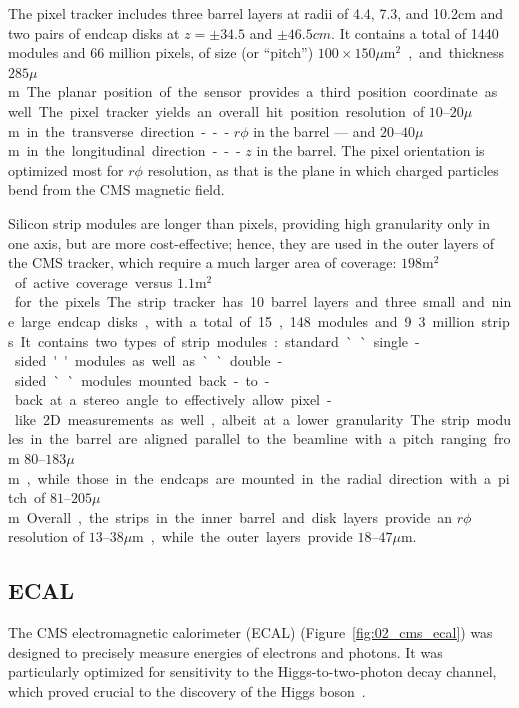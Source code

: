 The pixel tracker includes three barrel layers at radii of 4.4, 7.3, and 10.2\unit{cm} and two pairs of endcap disks at $z = \pm34.5$ and $\pm46.5\unit{cm}$. 
It contains a total of 1440 modules and 66 million pixels, of size (or ``pitch'') $100\times150$\unit{$\mu$m$^2$}, and thickness $285$\unit{$\mu$m}.
The planar position of the sensor provides a third position coordinate as well.
The pixel tracker yields an overall hit position resolution of $10$--$20$\unit{$\mu$m} in the transverse direction --- $r\phi$ in the barrel ---  and $20$--$40$\unit{$\mu$m} in the longitudinal direction --- $z$ in the barrel.
The pixel orientation is optimized most for $r\phi$ resolution, as that is the plane in which charged particles bend from the CMS magnetic field.

Silicon strip modules are longer than pixels, providing high granularity only in one axis, but are more cost-effective; hence, they are used in the outer layers of the CMS tracker, which require a much larger area of coverage: $198$\unit{m$^2$} of active coverage versus $1.1$\unit{m$^2$} for the pixels.
The strip tracker has 10 barrel layers and three small and nine large endcap disks, with a total of 15,148 modules and 9.3 million strips.
It contains two types of strip modules: standard ``single-sided'' modules as well as ``double-sided`` modules mounted back-to-back at a stereo angle to effectively allow pixel-like 2D measurements as well, albeit at a lower granularity.

The strip modules in the barrel are aligned parallel to the beamline with a pitch ranging from $80$--$183$\unit{$\mu$m}, while those in the endcaps are mounted in the radial direction with a pitch of $81$--$205$\unit{$\mu$m}.
Overall, the strips in the inner barrel and disk layers provide an $r\phi$ resolution of $13$--$38$\unit{$\mu$m}, while the outer layers provide $18$--$47$\unit{$\mu$m}.


\subsection{ECAL}

The CMS electromagnetic calorimeter (ECAL) (Figure~\ref{fig:02_cms_ecal}) was designed to precisely measure energies of electrons and photons.
It was particularly optimized for sensitivity to the Higgs-to-two-photon decay channel, which proved crucial to the discovery of the Higgs boson~\cite{CMS:2012qbp}.

